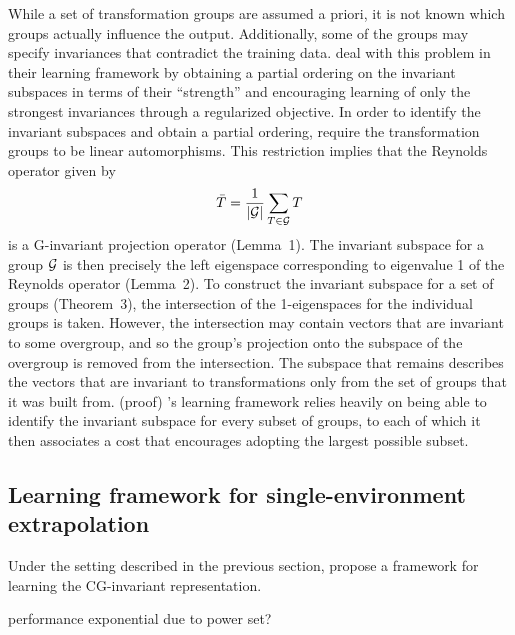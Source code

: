 While a set of transformation groups are assumed a priori, it is not known which groups actually influence the output. Additionally, some of the groups may specify invariances that contradict the training data. \citeauthor{Mouli:2021} deal with this problem in their learning framework by obtaining a partial ordering on the invariant subspaces in terms of their ``strength'' and encouraging learning of only the strongest invariances through a regularized objective. In order to identify the invariant subspaces and obtain a partial ordering, \citeauthor{Mouli:2021} require the transformation groups to be linear automorphisms. This restriction implies that the Reynolds operator given by
\[
\bar{T} = \frac{1}{|\mathcal{G}|}\sum_{T\in\mathcal{G}}T
\]
is a G-invariant projection operator (Lemma~1). The invariant subspace for a group $\mathcal{G}$ is then precisely the left eigenspace corresponding to eigenvalue 1 of the Reynolds operator (Lemma~2). To construct the invariant subspace for a set of groups (Theorem~3), the intersection of the 1-eigenspaces for the individual groups is taken. However, the intersection may contain vectors that are invariant to some overgroup, and so the group's projection onto the subspace of the overgroup is removed from the intersection. The subspace that remains describes the vectors that are invariant to transformations only from the set of groups that it was built from. (\todo proof) \citeauthor{Mouli:2021}'s learning framework relies heavily on being able to identify the invariant subspace for every subset of groups, to each of which it then associates a cost that encourages adopting the largest possible subset.


\subsection{Learning framework for single-environment extrapolation}

\todo Under the setting described in the previous section, \textcite{Mouli:2021} propose a framework for learning the CG-invariant representation.

\todo performance exponential due to power set?